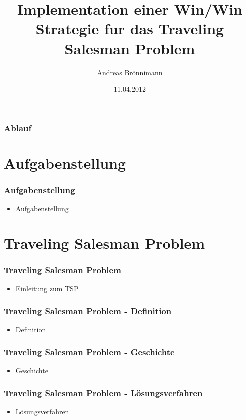 \documentclass[12pt]{beamer}
\title[Semesterarbeit]{Implementation einer Win/Win Strategie fur das Traveling Salesman Problem}
\author{Andreas Brönnimann}
\institute{ZHAW - Zürcher Hochschule für Angewandte Wissenschaften}
\date{11.04.2012}
\begin{document}
    \begin{frame}
        \titlepage
    \end{frame}

    \begin{frame}
        \frametitle{Ablauf}
        \tableofcontents
    \end{frame}

    \section{Aufgabenstellung}
    \begin{frame}
        \frametitle{Aufgabenstellung}
	    \begin{itemize}
                \item Aufgabenstellung
            \end{itemize}
    \end{frame}
    \section{Traveling Salesman Problem}
    \begin{frame}
        \frametitle{Traveling Salesman Problem}
	    \begin{itemize}
                \item Einleitung zum TSP
            \end{itemize}
    \end{frame}
    \begin{frame}
        \frametitle{Traveling Salesman Problem - Definition}
	    \begin{itemize}
                \item Definition
            \end{itemize}
    \end{frame}
    \begin{frame}
        \frametitle{Traveling Salesman Problem - Geschichte}
	    \begin{itemize}
                \item Geschichte
            \end{itemize}
    \end{frame}
    \begin{frame}
        \frametitle{Traveling Salesman Problem - Lösungsverfahren}
	    \begin{itemize}
                \item Lösungsverfahren
            \end{itemize}
    \end{frame}
\end{document}
